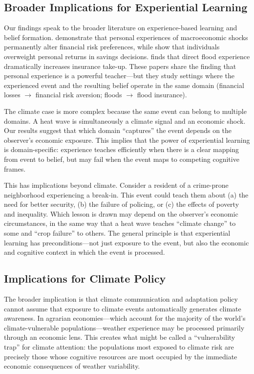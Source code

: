 \documentclass[12pt]{article}
\begin{document}
\subsection{Broader Implications for Experiential Learning}

Our findings speak to the broader literature on experience-based learning and belief formation. \citet{malmendier2011depression} demonstrate that personal experiences of macroeconomic shocks permanently alter financial risk preferences, while \citet{choi2009reinforcement} show that individuals overweight personal returns in savings decisions. \citet{gallagher2014learning} finds that direct flood experience dramatically increases insurance take-up. These papers share the finding that personal experience is a powerful teacher---but they study settings where the experienced event and the resulting belief operate in the same domain (financial losses $\rightarrow$ financial risk aversion; floods $\rightarrow$ flood insurance).

The climate case is more complex because the same event can belong to multiple domains. A heat wave is simultaneously a climate signal and an economic shock. Our results suggest that which domain ``captures'' the event depends on the observer's economic exposure. This implies that the power of experiential learning is domain-specific: experience teaches efficiently when there is a clear mapping from event to belief, but may fail when the event maps to competing cognitive frames.

This has implications beyond climate. Consider a resident of a crime-prone neighborhood experiencing a break-in. This event could teach them about (a) the need for better security, (b) the failure of policing, or (c) the effects of poverty and inequality. Which lesson is drawn may depend on the observer's economic circumstances, in the same way that a heat wave teaches ``climate change'' to some and ``crop failure'' to others. The general principle is that experiential learning has preconditions---not just exposure to the event, but also the economic and cognitive context in which the event is processed.

\subsection{Implications for Climate Policy}

The broader implication is that climate communication and adaptation policy cannot assume that exposure to climate events automatically generates climate awareness. In agrarian economies---which account for the majority of the world's climate-vulnerable populations---weather experience may be processed primarily through an economic lens. This creates what might be called a ``vulnerability trap'' for climate attention: the populations most exposed to climate risk are precisely those whose cognitive resources are most occupied by the immediate economic consequences of weather variability.
\end{document}
